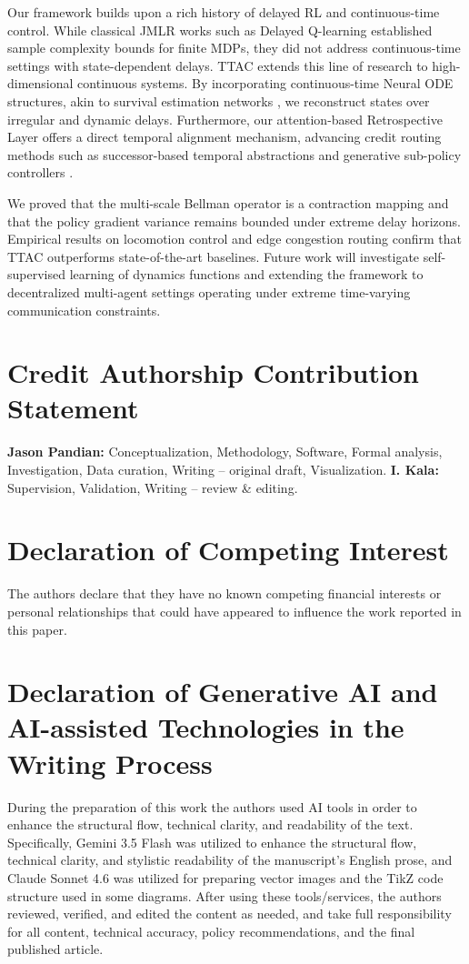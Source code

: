 \documentclass[manuscript, screen, review]{jair}
\begin{document}
Our framework builds upon a rich history of delayed RL and continuous-time control. While classical JMLR works such as Delayed Q-learning \citep{strehl2009reinforcement} established sample complexity bounds for finite MDPs, they did not address continuous-time settings with state-dependent delays. TTAC extends this line of research to high-dimensional continuous systems. By incorporating continuous-time Neural ODE structures, akin to survival estimation networks \citep{tang2022soden}, we reconstruct states over irregular and dynamic delays. Furthermore, our attention-based Retrospective Layer offers a direct temporal alignment mechanism, advancing credit routing methods such as successor-based temporal abstractions \citep{machado2023temporal} and generative sub-policy controllers \citep{ghadirzadeh2022training}.

We proved that the multi-scale Bellman operator is a contraction mapping and that the policy gradient variance remains bounded under extreme delay horizons. Empirical results on locomotion control and edge congestion routing confirm that TTAC outperforms state-of-the-art baselines. Future work will investigate self-supervised learning of dynamics functions and extending the framework to decentralized multi-agent settings operating under extreme time-varying communication constraints.

\section*{Credit Authorship Contribution Statement}
\textbf{Jason Pandian:} Conceptualization, Methodology, Software, Formal analysis, Investigation, Data curation, Writing -- original draft, Visualization. \textbf{I. Kala:} Supervision, Validation, Writing -- review \& editing.

\section*{Declaration of Competing Interest}
The authors declare that they have no known competing financial interests or personal relationships that could have appeared to influence the work reported in this paper.

\section*{Declaration of Generative AI and AI-assisted Technologies in the Writing Process}
During the preparation of this work the authors used AI tools in order to enhance the structural flow, technical clarity, and readability of the text. Specifically, Gemini 3.5 Flash was utilized to enhance the structural flow, technical clarity, and stylistic readability of the manuscript's English prose, and Claude Sonnet 4.6 was utilized for preparing vector images and the TikZ code structure used in some diagrams. After using these tools/services, the authors reviewed, verified, and edited the content as needed, and take full responsibility for all content, technical accuracy, policy recommendations, and the final published article.
\end{document}
